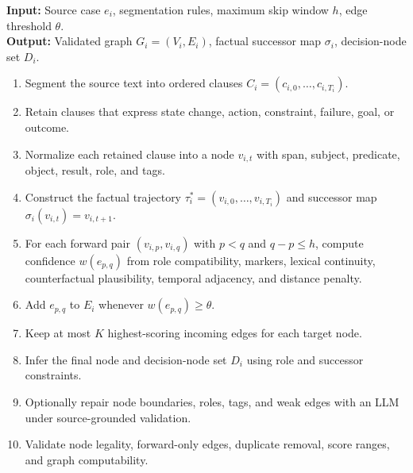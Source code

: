 
\begin{algorithm}\caption{Source-Grounded Narrative DAG Construction}
\label{alg:dag-construction}
\noindent\textbf{Input:} Source case $e_i$, segmentation rules, maximum skip window $h$, edge threshold $\theta$.\\
\textbf{Output:} Validated graph $G_i=(V_i,E_i)$, factual successor map $\sigma_i$, decision-node set $D_i$.
\begin{enumerate}
\item Segment the source text into ordered clauses $C_i=(c_{i,0},\ldots,c_{i,T_i})$.
\item Retain clauses that express state change, action, constraint, failure, goal, or outcome.
\item Normalize each retained clause into a node $v_{i,t}$ with span, subject, predicate, object, result, role, and tags.
\item Construct the factual trajectory $\tau_i^{*}=(v_{i,0},\ldots,v_{i,T_i})$ and successor map $\sigma_i(v_{i,t})=v_{i,t+1}$.
\item For each forward pair $(v_{i,p},v_{i,q})$ with $p<q$ and $q-p\le h$, compute confidence $w(e_{p,q})$ from role compatibility, markers, lexical continuity, counterfactual plausibility, temporal adjacency, and distance penalty.
\item Add $e_{p,q}$ to $E_i$ whenever $w(e_{p,q})\ge \theta$.
\item Keep at most $K$ highest-scoring incoming edges for each target node.
\item Infer the final node and decision-node set $D_i$ using role and successor constraints.
\item Optionally repair node boundaries, roles, tags, and weak edges with an LLM under source-grounded validation.
\item Validate node legality, forward-only edges, duplicate removal, score ranges, and graph computability.
\end{enumerate}
\end{algorithm}

